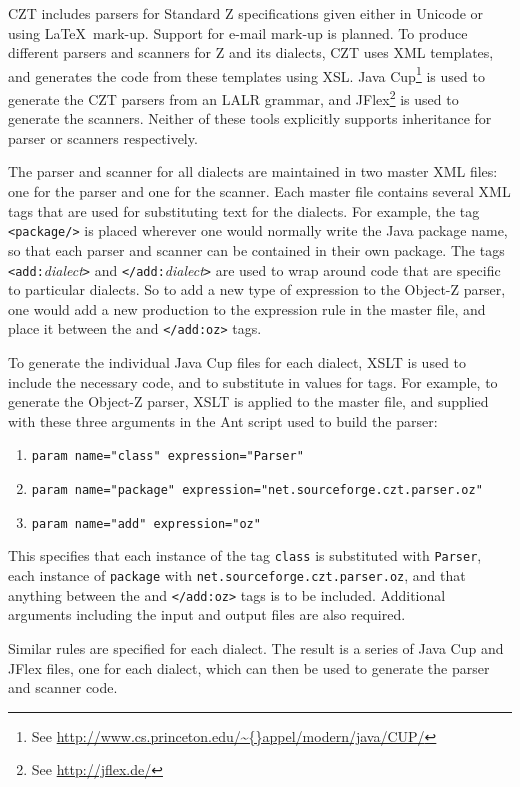 \documentclass{llncs}
\begin{document}
  CZT includes parsers for Standard Z specifications given either in
  Unicode or using \LaTeX\ mark-up.  Support for e-mail mark-up is
  planned. To produce different parsers and scanners for Z and its
  dialects, CZT uses XML templates, and generates the code from these
  templates using XSL. Java Cup\footnote{See
  \url{http://www.cs.princeton.edu/\~{}appel/modern/java/CUP/}} is
  used to generate the CZT parsers from an LALR grammar, and
  JFlex\footnote{See \url{http://jflex.de/}} is used to generate the
  scanners. Neither of these tools explicitly supports inheritance for
  parser or scanners respectively.

The parser and scanner for all dialects are maintained in two master
XML files: one for the parser and one for the scanner. Each master
file contains several XML tags that are used for substituting text for
the dialects. For example, the tag {\tt <package/>} is placed wherever
one would normally write the Java package name, so that each parser
and scanner can be contained in their own package. The tags {\tt
<add:}{\em dialect}{\tt >} and {\tt </add:}{\em dialect}{\tt >} are
used to wrap around code that are specific to particular dialects. So
to add a new type of expression to the Object-Z parser, one would add
a new production to the expression rule in the master file, and place
it between the {\tt <add:oz>} and {\tt </add:oz>} tags.

To generate the individual Java Cup files for each dialect, XSLT is
used to include the necessary code, and to substitute in values for
tags. For example, to generate the Object-Z parser, XSLT is applied to
the master file, and supplied with these three arguments in the Ant
script used to build the parser:
\begin{enumerate}
  \item {\tt param name="class" expression="Parser"}
  \item {\tt param name="package" expression="net.sourceforge.czt.parser.oz"}
  \item {\tt param name="add" expression="{oz}"}
\end{enumerate}

This specifies that each instance of the tag {\tt class} is
substituted with {\tt Parser}, each instance of {\tt package} with
{\tt net.sourceforge.czt.parser.oz}, and that anything between the
{\tt <add:oz>} and {\tt </add:oz>} tags is to be included. Additional
arguments including the input and output files are also required.

Similar rules are specified for each dialect. The result is a series
of Java Cup and JFlex files, one for each dialect, which can then be
used to generate the parser and scanner code.
\end{document}
